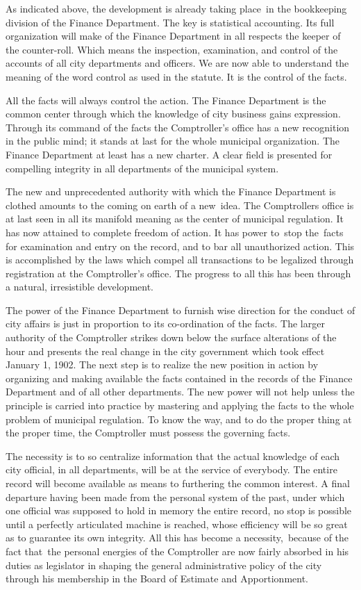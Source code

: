 \documentclass[openany,nobib]{tufte-book}
\begin{document}
As indicated above, the development is already taking place~in the
bookkeeping division of the Finance Department. The key is statistical
accounting. Its full organization will make of the Finance Department in
all respects the keeper of the counter-roll. Which means the inspection,
examination, and control of the accounts of all city departments and
officers. We are now able to understand the meaning of the word control
as used in the statute. It is the control of the facts.~

All the facts will always control the action. The Finance Department is
the common center through which the knowledge of city business gains
expression. Through its command of the facts the Comptroller's office
has a new recognition in the public mind; it stands at last for the
whole municipal organization. The Finance Department at least has a new
charter. A clear field is presented for compelling integrity in all
departments of the municipal system.~

The new and unprecedented authority with which the Finance Department is
clothed amounts to the coming on earth of a new~idea. The
Comptroller\textquotesingle s office is at last seen in all its manifold
meaning as the center of municipal regulation. It has now attained to
complete freedom of action. It has power to~stop the~facts for
examination and entry on the record, and to bar all unauthorized action.
This is accomplished by the laws which compel all transactions to be
legalized through registration at the Comptroller's office. The progress
to all this has been through a natural, irresistible development.~

The power of the Finance Department to furnish wise direction for the
conduct of city affairs is just in proportion to its co-ordination of
the facts. The larger authority of the Comptroller strikes down below
the surface alterations of the hour and presents the real change in the
city government which took effect January 1, 1902. The next step is to
realize the new position in action by organizing and making available
the facts contained in the records of the Finance Department and of all
other departments. The new power will not help unless the principle is
carried into practice by mastering and applying the facts to the whole
problem of municipal regulation. To know the way, and to do the proper
thing at the proper time, the Comptroller must possess the governing
facts.~

The necessity is to so centralize information that the actual knowledge
of each city official, in all departments, will be at the service of
everybody. The entire record will become available as means to
furthering the common interest. A final departure having been made from
the personal system of the past, under which one official was supposed
to hold in memory the entire record, no stop is possible until a
perfectly articulated machine is reached, whose efficiency will be so
great as to guarantee its own integrity. All this has become a
necessity,~because of the fact that~the personal energies of the
Comptroller are now fairly absorbed in his duties as legislator in
shaping the general administrative policy of the city through his
membership in the Board of Estimate and Apportionment.~
\end{document}
